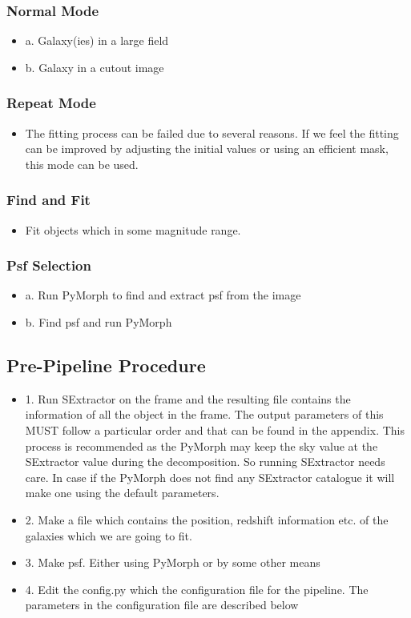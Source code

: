 \documentclass[a4paper,12pt]{article}
\begin{document}
\subsubsection{Normal Mode}
\begin{itemize}
\item 
a. Galaxy(ies) in a large field
\item
b. Galaxy in a cutout image
\end{itemize}

\subsubsection{Repeat Mode}
\begin{itemize}
 \item 
The fitting process can be failed due to several reasons. If we feel the fitting can be improved by adjusting the initial values or using an efficient mask, this mode can be used.
\end{itemize}

\subsubsection{Find and Fit}
\begin{itemize}
\item 
Fit objects which in some magnitude range.
\end{itemize}
\subsubsection{Psf Selection}
\begin{itemize}
\item 
a. Run PyMorph to find and extract psf from the image
\item
b. Find psf and run PyMorph
\end{itemize}
\subsection{Pre-Pipeline Procedure}
\begin{itemize}
 \item 
 1. Run SExtractor on the frame and the resulting file contains the information of all the object in the frame. The output parameters of this MUST follow a particular order and that can be found in the appendix. This process is recommended as the PyMorph may keep the sky value at the SExtractor value during the decomposition. So running SExtractor needs care. In case if the PyMorph does not find any SExtractor catalogue it will make one using the default parameters.
\item
 2. Make a file which contains the position, redshift information etc. of the galaxies which we are going to fit.
\item
 3. Make psf. Either using PyMorph or by some other means
\item
 4. Edit the config.py which the configuration file for the pipeline. The parameters in the configuration file are described below
 \end{itemize}
\end{document}
